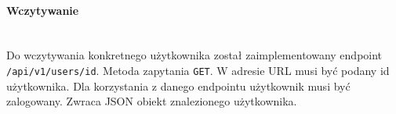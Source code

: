 
% 
\paragraph{Wczytywanie}\mbox{}\\
Do wczytywania konkretnego użytkownika został zaimplementowany endpoint \texttt{/api/v1/users/{id}}.
Metoda zapytania \texttt{GET}.
W adresie URL musi być podany id użytkownika.
Dla korzystania z danego endpointu użytkownik musi być zalogowany.
Zwraca JSON obiekt znalezionego użytkownika.

